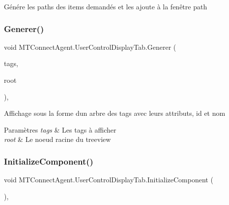 Génére les paths des items demandés et les ajoute à la fenêtre path 

\mbox{\label{class_m_t_connect_agent_1_1_user_control_display_tab_a936a17ca9a88c0cbab0e70894567cdad}} 
\subsubsection{\texorpdfstring{Generer()}{Generer()}}
{\footnotesize\ttfamily void M\+T\+Connect\+Agent.\+User\+Control\+Display\+Tab.\+Generer (\begin{DoxyParamCaption}\item[{I\+List$<$ \mbox{\hyperlink{class_m_t_connect_agent_1_1_model_1_1_tag}{Tag}} $>$}]{tags,  }\item[{Tree\+Node}]{root }\end{DoxyParamCaption})\hspace{0.3cm}{\ttfamily [inline]}, {\ttfamily [private]}}



Affichage sous la forme d\textquotesingle{}un arbre des tags avec leurs attributs, id et nom 


\begin{DoxyParams}{Paramètres}
{\em tags} & Les tags à afficher\\
\hline
{\em root} & Le noeud racine du treeview\\
\hline
\end{DoxyParams}
\mbox{\label{class_m_t_connect_agent_1_1_user_control_display_tab_a7280eefa02218d37616dadb3c0e01136}} 
\subsubsection{\texorpdfstring{Initialize\+Component()}{InitializeComponent()}}
{\footnotesize\ttfamily void M\+T\+Connect\+Agent.\+User\+Control\+Display\+Tab.\+Initialize\+Component (\begin{DoxyParamCaption}{ }\end{DoxyParamCaption})\hspace{0.3cm}{\ttfamily [inline]}, {\ttfamily [private]}}



